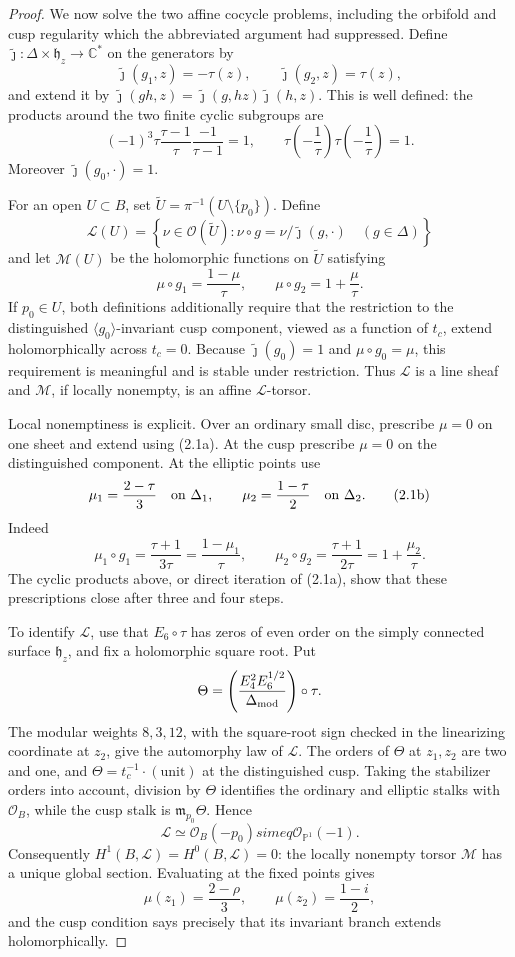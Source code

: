 \begin{proof}
We now solve the two affine cocycle problems, including the orbifold and
cusp regularity which the abbreviated argument had suppressed.  Define
\(\widetilde\jmath:\Delta\times\mathfrak h_z\to\mathbb C^*\) on the
generators by
\[
 \widetilde\jmath(g_1,z)=-\tau(z),\qquad
 \widetilde\jmath(g_2,z)=\tau(z),
\]
and extend it by
\(\widetilde\jmath(gh,z)=\widetilde\jmath(g,hz)
\widetilde\jmath(h,z)\).  This is well defined: the products around the
two finite cyclic subgroups are
\[
 (-1)^3\tau\frac{\tau-1}{\tau}\frac{-1}{\tau-1}=1,
 \qquad
 \tau\left(-\frac1\tau\right)\tau\left(-\frac1\tau\right)=1.
\]
Moreover \(\widetilde\jmath(g_0,\cdot)=1\).

For an open \(U\subset B\), set
\(\widetilde U=\pi^{-1}(U\setminus\{p_0\})\).  Define
\[
 \mathcal L(U)=\left\{\nu\in\mathcal O(\widetilde U):
 \nu\circ g=\nu/\widetilde\jmath(g,\cdot)\quad(g\in\Delta)\right\}
\]
and let \(\mathcal M(U)\) be the holomorphic functions on
\(\widetilde U\) satisfying
\[
 \mu\circ g_1=\frac{1-\mu}{\tau},\qquad
 \mu\circ g_2=1+\frac\mu\tau.
 \tag{2.1a}
\]
If \(p_0\in U\), both definitions additionally require that the restriction
to the distinguished \(\langle g_0\rangle\)-invariant cusp component,
viewed as a function of \(t_c\), extend holomorphically across \(t_c=0\).
Because \(\widetilde\jmath(g_0)=1\) and \(\mu\circ g_0=\mu\), this
requirement is meaningful and is stable under restriction.  Thus
\(\mathcal L\) is a line sheaf and \(\mathcal M\), if locally nonempty, is
an affine \(\mathcal L\)-torsor.

Local nonemptiness is explicit.  Over an ordinary small disc, prescribe
\(\mu=0\) on one sheet and extend using (2.1a).  At the cusp prescribe
\(\mu=0\) on the distinguished component.  At the elliptic points use
\[
 \mu_1=\frac{2-\tau}{3}\quad\hbox{on }\Delta_1,
 \qquad
 \mu_2=\frac{1-\tau}{2}\quad\hbox{on }\Delta_2.
 \tag{2.1b}
\]
Indeed
\[
 \mu_1\circ g_1=\frac{\tau+1}{3\tau}
 =\frac{1-\mu_1}{\tau},
 \qquad
 \mu_2\circ g_2=\frac{\tau+1}{2\tau}
 =1+\frac{\mu_2}{\tau}.
\]
The cyclic products above, or direct iteration of (2.1a), show that these
prescriptions close after three and four steps.

To identify \(\mathcal L\), use that \(E_6\circ\tau\) has zeros of even
order on the simply connected surface \(\mathfrak h_z\), and fix a
holomorphic square root.  Put
\[
 \Theta=\left(\frac{E_4^2E_6^{1/2}}{\Delta_{\rm mod}}\right)\circ\tau.
\]
The modular weights \(8,3,12\), with the square-root sign checked in the
linearizing coordinate at \(z_2\), give the automorphy law of
\(\mathcal L\).  The orders of \(\Theta\) at \(z_1,z_2\) are two and one,
and \(\Theta=t_c^{-1}\cdot(\text{unit})\) at the distinguished cusp.
Taking the stabilizer orders into account, division by \(\Theta\) identifies
the ordinary and elliptic stalks with \(\mathcal O_B\), while the cusp stalk
is \(\mathfrak m_{p_0}\Theta\).  Hence
\[
 \mathcal L\simeq\mathcal O_B(-p_0)simeq\mathcal O_{\mathbb P^1}(-1).
\]
Consequently \(H^1(B,\mathcal L)=H^0(B,\mathcal L)=0\): the locally
nonempty torsor \(\mathcal M\) has a unique global section.  Evaluating at
the fixed points gives
\[
 \mu(z_1)=\frac{2-\rho}{3},\qquad
 \mu(z_2)=\frac{1-i}{2},
\]
and the cusp condition says precisely that its invariant branch extends
holomorphically.


\end{proof}
